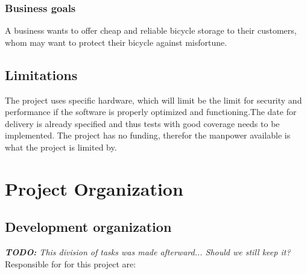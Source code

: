 \documentclass[12pt,titlepage]{article}
\begin{document}
\subsubsection{Business goals}
A business wants to offer cheap and reliable bicycle storage to their customers,
whom may want to protect their bicycle against misfortune.

\subsection{Limitations}
The project uses specific hardware, which will limit be the limit for security
and performance if the software is properly optimized and functioning.The date
for delivery is already specified and thus tests with good coverage needs to be
implemented. The project has no funding, therefor the manpower available is what
the project is limited by.


\section{Project Organization}

\subsection{Development organization}

\textit{\textbf{TODO:} This division of tasks was made afterward... Should we
still keep it?} \\

Responsible for for this project are:
\end{document}
